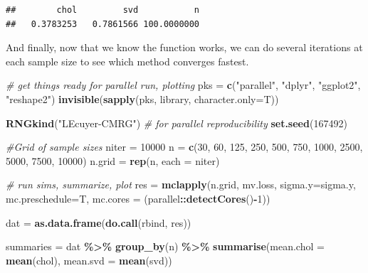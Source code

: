 \documentclass[
]{article}
\newenvironment{Shaded}{\begin{snugshade}}{\end{snugshade}}
\newcommand{\CommentTok}[1]{\textcolor[rgb]{0.56,0.35,0.01}{\textit{#1}}}
\newcommand{\DataTypeTok}[1]{\textcolor[rgb]{0.13,0.29,0.53}{#1}}
\newcommand{\DecValTok}[1]{\textcolor[rgb]{0.00,0.00,0.81}{#1}}
\newcommand{\KeywordTok}[1]{\textcolor[rgb]{0.13,0.29,0.53}{\textbf{#1}}}
\newcommand{\NormalTok}[1]{#1}
\newcommand{\OperatorTok}[1]{\textcolor[rgb]{0.81,0.36,0.00}{\textbf{#1}}}
\newcommand{\StringTok}[1]{\textcolor[rgb]{0.31,0.60,0.02}{#1}}
\begin{document}
\begin{verbatim}
##        chol         svd           n 
##   0.3783253   0.7861566 100.0000000
\end{verbatim}

\hfill\break

And finally, now that we know the function works, we can do several
iterations at each sample size to see which method converges fastest.

\begin{Shaded}
\begin{Highlighting}[]
\CommentTok{\# get things ready for parallel run, plotting}
\NormalTok{pks =}\StringTok{ }\KeywordTok{c}\NormalTok{(}\StringTok{"parallel"}\NormalTok{, }\StringTok{"dplyr"}\NormalTok{, }\StringTok{"ggplot2"}\NormalTok{, }\StringTok{"reshape2"}\NormalTok{)}
\KeywordTok{invisible}\NormalTok{(}\KeywordTok{sapply}\NormalTok{(pks, library, }\DataTypeTok{character.only=}\NormalTok{T))}

\KeywordTok{RNGkind}\NormalTok{(}\StringTok{"L\textquotesingle{}Ecuyer{-}CMRG"}\NormalTok{) }\CommentTok{\# for parallel reproducibility}
\KeywordTok{set.seed}\NormalTok{(}\DecValTok{167492}\NormalTok{)}

\CommentTok{\#Grid of sample sizes}
\NormalTok{niter =}\StringTok{ }\DecValTok{10000}
\NormalTok{n =}\StringTok{ }\KeywordTok{c}\NormalTok{(}\DecValTok{30}\NormalTok{, }\DecValTok{60}\NormalTok{, }\DecValTok{125}\NormalTok{, }\DecValTok{250}\NormalTok{, }\DecValTok{500}\NormalTok{, }\DecValTok{750}\NormalTok{, }\DecValTok{1000}\NormalTok{, }\DecValTok{2500}\NormalTok{, }\DecValTok{5000}\NormalTok{, }\DecValTok{7500}\NormalTok{, }\DecValTok{10000}\NormalTok{)}
\NormalTok{n.grid =}\StringTok{ }\KeywordTok{rep}\NormalTok{(n, }\DataTypeTok{each =}\NormalTok{ niter)}

\CommentTok{\# run sims, summarize, plot}
\NormalTok{res =}\StringTok{ }\KeywordTok{mclapply}\NormalTok{(n.grid, mv.loss, }\DataTypeTok{sigma.y=}\NormalTok{sigma.y, }
               \DataTypeTok{mc.preschedule=}\NormalTok{T,}
               \DataTypeTok{mc.cores =}\NormalTok{ (parallel}\OperatorTok{::}\KeywordTok{detectCores}\NormalTok{()}\OperatorTok{{-}}\DecValTok{1}\NormalTok{))}

\NormalTok{dat =}\StringTok{ }\KeywordTok{as.data.frame}\NormalTok{(}\KeywordTok{do.call}\NormalTok{(rbind, res))}

\NormalTok{summaries =}\StringTok{ }\NormalTok{dat }\OperatorTok{\%\textgreater{}\%}\StringTok{ }
\StringTok{  }\KeywordTok{group\_by}\NormalTok{(n) }\OperatorTok{\%\textgreater{}\%}\StringTok{ }
\StringTok{  }\KeywordTok{summarise}\NormalTok{(}\DataTypeTok{mean.chol =} \KeywordTok{mean}\NormalTok{(chol),}
            \DataTypeTok{mean.svd  =} \KeywordTok{mean}\NormalTok{(svd))}


\end{Highlighting}
\end{Shaded}
\end{document}

